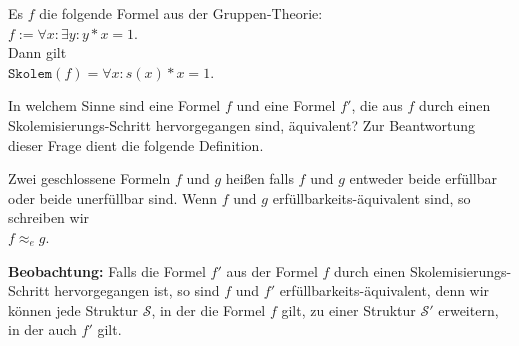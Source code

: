 \example
Es $f$ die folgende Formel aus der Gruppen-Theorie:
\\[0.2cm]
\hspace*{1.3cm}
$f := \forall x: \exists y: y * x = 1$. 
\\[0.2cm]
Dann gilt
\\[0.2cm]
\hspace*{1.3cm}
$\mathtt{Skolem}(f) = \forall x : s(x) * x = 1$.  \eox

\noindent
In welchem Sinne sind eine Formel $f$ und eine Formel $f'$, die aus $f$ durch einen 
Skolem\-isierungs-Schritt hervorgegangen sind, äquivalent?  Zur Beantwortung dieser Frage
dient die folgende Definition. 

\begin{Definition} \hspace*{\fill} \linebreak
   Zwei geschlossene Formeln $f$ und $g$ heißen 
   falls $f$ und $g$ entweder beide erfüllbar oder beide unerfüllbar sind.
   Wenn $f$ und $g$ erfüllbarkeits-äquivalent sind, so schreiben wir \\[0.2cm]
   \hspace*{1.3cm} $f \approx_e g$.
\eox
\end{Definition}

\noindent
\textbf{Beobachtung:}
Falls die Formel $f'$ aus der Formel $f$ durch einen Skolemisierungs-Schritt 
hervorgegangen ist, so sind $f$ und $f'$ erfüllbarkeits-äquivalent, denn wir können jede Struktur
$\mathcal{S}$, in der die Formel $f$ gilt, zu einer Struktur $\mathcal{S}'$ erweitern, in der auch $f'$ gilt.
\eox

